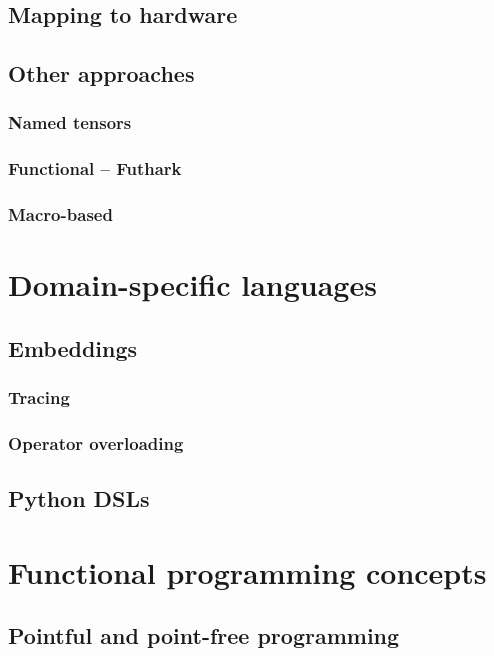 \subsection{Mapping to hardware}

\subsection{Other approaches}

\subsubsection{Named tensors}

\subsubsection{Functional -- Futhark}

\subsubsection{Macro-based}

\section{Domain-specific languages}

\subsection{Embeddings}

\subsubsection{Tracing}

\subsubsection{Operator overloading}

\subsection{Python DSLs}

\section{Functional programming concepts}

\subsection{Pointful and point-free programming}

